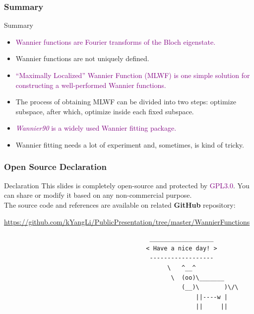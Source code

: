 \documentclass{beamer}
\begin{document}
  \begin{frame}
    \frametitle{Summary}
    \begin{block}{Summary}
      \begin{itemize}
        \item \textcolor{purple}{Wannier functions are Fourier transforms of the Bloch eigenstate.}
        \item Wannier functions are not uniquely defined.
        \item \textcolor{purple}{``Maximally Localized'' Wannier Function (MLWF) is one simple solution for constructing a well-performed Wannier functions.}
        \item The process of obtaining MLWF can be divided into two steps: optimize subspace, after which, optimize inside each fixed subspace.
        \item \textcolor{purple}{\emph{Wannier90} is a widely used Wannier fitting package.}
        \item Wannier fitting needs a lot of experiment and, sometimes, is kind of tricky. 
      \end{itemize}
    \end{block}

  \end{frame}

  \begin{frame}[fragile]
    \frametitle{Open Source Declaration}
    \large
    \begin{block}{Declaration}
      This slides is completely open-source and protected by \textcolor{purple}{GPL3.0}. You can share or modify it based on any non-commercial purpose.\\[5pt]

      The source code and references are available on related \textbf{GitHub} repository:
      
      \textcolor{purple}{\url{https://github.com/kYangLi/PublicPresentation/tree/master/WannierFunctions}}
    \end{block}
    \tiny
    \begin{verbatim}
                                         __________________
                                        < Have a nice day! >
                                         ------------------
                                              \   ^__^
                                               \  (oo)\_______
                                                  (__)\       )\/\
                                                      ||----w |
                                                      ||     || 
    \end{verbatim}
  \end{frame}
\end{document}
